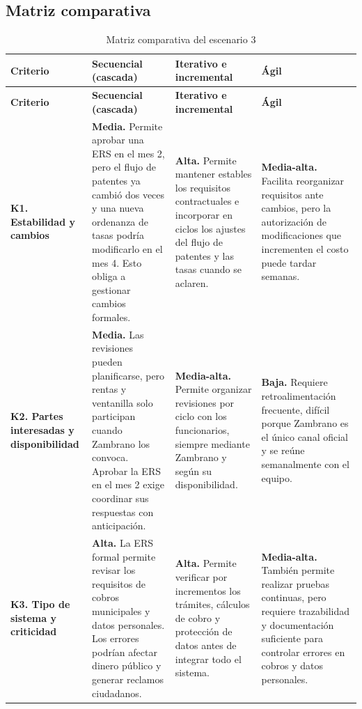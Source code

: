 \documentclass[12pt,a4paper]{article}
\renewcommand{\arraystretch}{1.3}
\begin{document}
\subsection{Matriz comparativa}

\begingroup
\footnotesize
\setlength{\tabcolsep}{3pt}
\renewcommand{\arraystretch}{1.1}

\begin{longtable}{
>{\raggedright\arraybackslash}p{2.2cm}
>{\raggedright\arraybackslash}p{3.8cm}
>{\raggedright\arraybackslash}p{3.8cm}
>{\raggedright\arraybackslash}p{3.8cm}
}

\caption{Matriz comparativa del escenario 3}\\
\toprule
\textbf{Criterio} &
\textbf{Secuencial (cascada)} &
\textbf{Iterativo e incremental} &
\textbf{Ágil} \\
\midrule
\endfirsthead

\toprule
\textbf{Criterio} &
\textbf{Secuencial (cascada)} &
\textbf{Iterativo e incremental} &
\textbf{Ágil} \\
\midrule
\endhead

\textbf{K1. Estabilidad y cambios} &
\textbf{Media.} Permite aprobar una ERS en el mes 2, pero el flujo de patentes ya cambió dos veces y una nueva ordenanza de tasas podría modificarlo en el mes 4. Esto obliga a gestionar cambios formales. &
\textbf{Alta.} Permite mantener estables los requisitos contractuales e incorporar en ciclos los ajustes del flujo de patentes y las tasas cuando se aclaren. &
\textbf{Media-alta.} Facilita reorganizar requisitos ante cambios, pero la autorización de modificaciones que incrementen el costo puede tardar semanas. \\
\midrule

\textbf{K2. Partes interesadas y disponibilidad} &
\textbf{Media.} Las revisiones pueden planificarse, pero rentas y ventanilla solo participan cuando Zambrano los convoca. Aprobar la ERS en el mes 2 exige coordinar sus respuestas con anticipación. &
\textbf{Media-alta.} Permite organizar revisiones por ciclo con los funcionarios, siempre mediante Zambrano y según su disponibilidad. &
\textbf{Baja.} Requiere retroalimentación frecuente, difícil porque Zambrano es el único canal oficial y se reúne semanalmente con el equipo. \\
\midrule

\textbf{K3. Tipo de sistema y criticidad} &
\textbf{Alta.} La ERS formal permite revisar los requisitos de cobros municipales y datos personales. Los errores podrían afectar dinero público y generar reclamos ciudadanos. &
\textbf{Alta.} Permite verificar por incrementos los trámites, cálculos de cobro y protección de datos antes de integrar todo el sistema. &
\textbf{Media-alta.} También permite realizar pruebas continuas, pero requiere trazabilidad y documentación suficiente para controlar errores en cobros y datos personales. \\
\midrule


\end{longtable}
\end{document}
